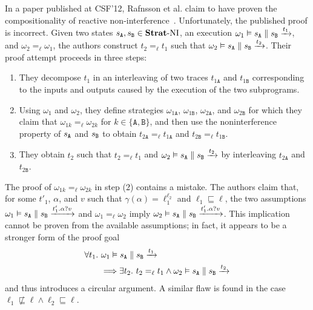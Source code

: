 \documentclass[preprint,5p,twocolumn]{elsarticle}
\begin{document}
In a paper published at CSF'12, Rafnsson et al. claim to
have proven the compositionality of reactive non-interference~\cite[p. 301-302]{Rafnsson2012}.
Unfortunately, the published proof is incorrect.
Given two states $s_{\mathtt{A}}, s_{\mathtt{B}} \in \mathbf{Strat}\text{-}\mathrm{NI}$,
an execution $\omega_1 \vDash s_{\mathtt{A}} \parallel s_{\mathtt{B}} \xrightarrow{t_1}$, and $\omega_2 =_\ell \omega_1$, the authors construct
$t_2 =_\ell t_1$ such that $\omega_2 \vDash s_{\mathtt{A}} \parallel s_{\mathtt{B}} \xrightarrow{t_2}$. Their proof attempt proceeds in three
steps:
\begin{enumerate}
\item They decompose $t_1$ in an interleaving of two traces $t_{1\mathtt{A}}$ and $t_{1\mathtt{B}}$ corresponding
  to the inputs and outputs caused by the execution of the two subprograms.
\item Using $\omega_1$ and $\omega_2$,
  they define strategies $\omega_{1\mathtt{A}}$, $\omega_{1\mathtt{B}}$, $\omega_{2\mathtt{A}}$, and $\omega_{2\mathtt{B}}$
  for which they claim that $\omega_{1k} =_\ell \omega_{2k}$ for $k \in \{\mathtt{A},\mathtt{B}\}$, and then use
  the noninterference property of $s_{\mathtt{A}}$ and $s_{\mathtt{B}}$ to obtain $t_{2\mathtt{A}} =_\ell t_{1\mathtt{A}}$ and $t_{2\mathtt{B}} =_\ell t_{1\mathtt{B}}$.
\item They obtain $t_2$ such that $t_2 =_\ell t_1$ and $\omega_2 \vDash s_{\mathtt{A}} \parallel s_{\mathtt{B}} \xrightarrow{t_2}$ by
  interleaving $t_{2\mathtt{A}}$ and $t_{2\mathtt{B}}$.
\end{enumerate}
The proof of $\omega_{1k} =_\ell \omega_{2k}$ in step (2) contains a mistake. The authors claim that, for some $t'_1$,
$\alpha$, and $v$ such that $\gamma(\alpha)=\ell_1^{\ell_2}$ and $\ell_1 \sqsubseteq \ell$,
the two assumptions $\omega_1 \vDash s_{\mathtt{A}} \parallel s_{\mathtt{B}} \xrightarrow{t'_1.\alpha?v}$ and $\omega_1 =_\ell \omega_2$ 
imply $\omega_2 \vDash s_{\mathtt{A}} \parallel s_{\mathtt{B}} \xrightarrow{t'_1.\alpha?v}$. This implication cannot be proven from the available
assumptions; in fact, it appears to be a stronger form of the proof goal
\begin{align*}
  \forall t_1.~&\omega_1 \vDash s_{\mathtt{A}} \parallel s_{\mathtt{B}} \xrightarrow{t_1} \\
  &\Longrightarrow \exists t_2.~t_2 =_\ell t_1 \wedge \omega_2 \vDash s_{\mathtt{A}} \parallel s_{\mathtt{B}} \xrightarrow{t_2}
\end{align*}
and thus introduces a circular argument. A similar flaw is found in the case $\ell_1 \not\sqsubseteq \ell \wedge \ell_2 \sqsubseteq \ell$.

\end{document}
